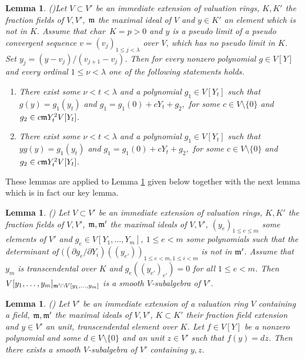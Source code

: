 \documentclass[12pt]{amsart}
\def\frk{\frak}               %
\def\mm{{\frk m}}
\newtheorem{Lemma}[Theorem]{Lemma}
\theoremstyle{definition}
\theoremstyle{subsection-tweak}
\theoremstyle{theorem}
\theoremstyle{definition}
\begin{document}
\begin{Lemma}(\cite[Corollary 17]{P3})\label{l2}
Let $V \subset V'$ be an  immediate extension of valuation rings,  $K, K'$ the fraction fields of $V, V'$, $\mm$ the maximal ideal of $V$ and  $y\in K'$ an  element  which is not in  $K$. 
Assume that char\ $K=p>0$ and $y$ is  a pseudo limit of a pseudo convergent sequence $v=(v_j)_{1\leq j<\lambda}$ over $V$, which  has no pseudo limit in $K$.
 Set $y_j=(y-v_j)/(v_{j+1}-v_j)$.
Then for every nonzero  polynomial  $g\in V[Y]$  and every ordinal $1\leq \nu<\lambda$ one of the following statements holds.

\begin{enumerate}
\item  There exist some  $\nu<t<\lambda$ and a polynomial $g_1\in V[Y_t]$ such that 
$g(y)=g_1(y_t)$
 and    $g_1=g_1(0)+c  Y_t+g_2,$ 
for some $c\in V\setminus \{0\}$ and  $g_2\in  c\mm Y_t^2 V[Y_t]$.
\item 
There exist some  $\nu<t<\lambda$ and a polynomial $g_1\in V[Y_t]$ such that 
$y g(y)=g_1(y_t)$
 and    $g_1=g_1(0)+c  Y_t+g_2,$ 
for some $c\in V\setminus \{0\}$ and  $g_2\in  c\mm Y_t^2 V[Y_t]$.
\end{enumerate}
\end{Lemma}

These lemmas are applied  to Lemma \ref{l3} given below together with the next lemma which is in fact our key lemma.

\begin{Lemma}(\cite[Lemma 21]{P3}) \label{k}
Let $V \subset V'$ be an  immediate extension of valuation rings,  $K, K'$ the fraction fields of $V, V'$, $\mm, \mm'$ the maximal ideals of $V,V'$, 
$(y_e)_{1\leq e\leq  m}$ some elements of $V'$ and $g_e\in V[Y_1,\ldots,Y_m]$, $1\leq e<m$ some polynomials such that the determinant of $((\partial g_e/\partial Y_i)((y_{e'}))_{1\leq e< m, 1\leq i<m}$ is not in $\mm'$.
 Assume that $y_m$ is transcendental over $K$ and $g_e((y_{e'})_{e'})=0$ for all $1\leq e<m$.
 Then $V[y_1,\ldots,y_m]_{\mm'\cap V[y_1,\ldots,y_m]}$ is  a smooth $V$-subalgebra  of $V'$.
\end{Lemma}

\begin{Lemma}(\cite[Lemma 22]{P3}) \label{l3}
 Let  $ V'$ be an  immediate extension  of a valuation ring $V$ containing a field, $\mm, \mm'$ the maximal ideals of $V,V'$, $K\subset K'$ their fraction field extension and $y\in V'$ an unit, transcendental element over $K$. 
Let  $f\in V[Y]$ be a nonzero polynomial and some $d\in V\setminus \{0\}$ and an unit $z\in V'$ such that $f(y)=d z$. Then there exists 
 a smooth $V$-subalgebra  of $V'$ containing $y,z$.  
\end{Lemma}
\end{document}

